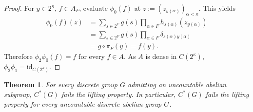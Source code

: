 \documentclass[10pt]{amsart}
\newtheorem{thm}{Theorem}[section]
\newtheorem{lem}[thm]{Lemma}
\theoremstyle{definition}
\begin{document}
\begin{proof}
    For $y\in 2^\kappa$, $f\in A_F$, evaluate $\phi_0(f)$ at $z:=(z_{y(\alpha)})_{\alpha<\kappa}$. This yields
    \begin{align*}
        \phi_0(f)(z) &= \sum_{s\in 2^F}g(s)\prod_{\alpha\in F} h_{s(\alpha)}(z_{y(\alpha)}) \\
        &= \sum_{s\in 2^F}g(s)\prod_{\alpha\in F}\delta_{s(\alpha)y(\alpha)} \\
        &= g\circ\pi_F(y)=f(y).
    \end{align*}
    Therefore $\phi_2\phi_0(f)=f$ for every $f\in A$.
    As $A$ is dense in $C(2^\kappa)$, $\phi_2\phi_1=\mathrm{id}_{C(2^\kappa)}$.
\end{proof}

\begin{thm}\label{disc2}
    For every discrete group $G$ admitting an uncountable abelian subgroup, $C^*(G)$ fails the lifting property. In particular, $C^*(G)$ fails the lifting property for every uncountable discrete abelian group $G$.
\end{thm}
\end{document}
